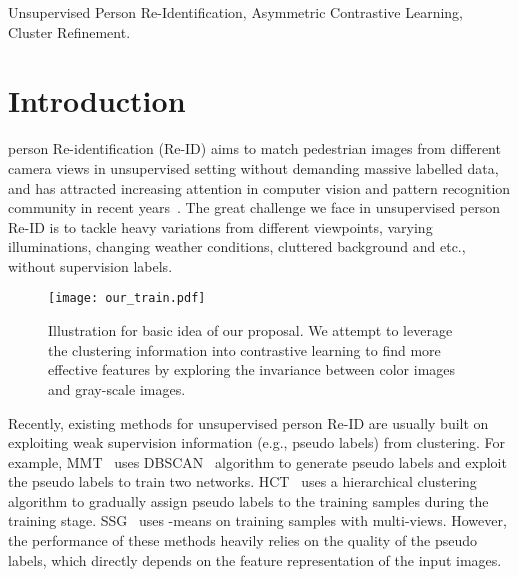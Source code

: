 \documentclass[journal]{IEEEtran}
\def\eg{e.g.}
\begin{document}
\begin{IEEEkeywords}
Unsupervised Person Re-Identification, Asymmetric Contrastive Learning, Cluster Refinement.
\end{IEEEkeywords}






\IEEEpeerreviewmaketitle



\section{Introduction}
\label{sec:intro}

 person Re-identification (Re-ID) aims to match pedestrian images from different camera views in unsupervised setting without demanding massive labelled data, and has attracted increasing attention in computer vision and pattern recognition community in recent years~\cite{Zheng:arXiv16}. The great challenge we face in unsupervised person Re-ID is to tackle heavy variations from different viewpoints, varying illuminations, changing weather conditions, 
cluttered background and etc., without supervision labels.

\begin{figure}[bth]
\begin{center}
{\texttt{[image: our\_train.pdf]}} 
\end{center}
\caption{Illustration for basic idea of our proposal. We attempt to leverage the clustering information into contrastive learning to find more effective features by exploring the invariance between color images and gray-scale images.}

\label{fig:basic-ideas}
\vspace{-8pt}
\end{figure}



Recently, existing methods for unsupervised person Re-ID are usually built on 
exploiting weak supervision information (\eg, pseudo labels) from clustering. 
For example, MMT~\cite{GE:ICLR20} uses DBSCAN~\cite{EsterDBSCAN:AAAI96} algorithm to generate pseudo labels and exploit the pseudo labels to train two networks. HCT~\cite{Zeng:CVPR20} uses a hierarchical clustering algorithm to gradually assign pseudo labels to the training samples during the training stage. SSG~\cite{Fu:ICCV19} uses -means on training samples with multi-views. 
However, the performance of these methods heavily relies on the quality of the pseudo labels, which directly depends on the feature representation of the input images.  
\end{document}

